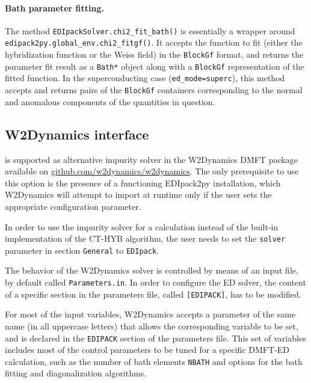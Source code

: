 \documentclass[edipack_sp.tex]{subfiles}
\begin{document}
\paragraph{{\bf Bath parameter fitting}.}
The method {\tt EDIpackSolver.chi2\_fit\_bath()} is essentially a wrapper around
{\tt edipack2py.global\_env.chi2\_fitgf()}. It accepts the function to fit (either
the hybridization function or the Weiss field) in the {\tt BlockGf} format,
and returns the parameter fit result as a {\tt Bath*} object along with a
{\tt BlockGf} representation of the fitted function. In the superconducting
case ({\tt ed\_mode=superc}), this method accepts and returns pairs of
the {\tt BlockGf} containers corresponding to the normal and anomalous 
components of the quantities in question.






\subsection{W2Dynamics interface}\label{sSecInteropW2DYN}
\NAME is supported as alternative impurity solver in the W2Dynamics DMFT package~\cite{Wallerberger2019CPC} available on \href{https://github.com/w2dynamics/w2dynamics}{github.com/w2dynamics/w2dynamics}. The only prerequisite to use this option is the presence of a functioning EDIpack2py installation, which W2Dynamics will attempt to import at runtime only if the user sets the appropriate configuration parameter.

In order to use the \NAME impurity solver for a calculation instead of the built-in implementation of the CT-HYB algorithm, the user needs to set the {\tt solver} parameter in section {\tt General} to {\tt EDIpack}. 

The  behavior of the W2Dynamics solver is controlled by means of an input file, by default called
{\tt Parameters.in}. In order to configure the ED solver, the content of a specific section in the parameters file, called {\tt [EDIPACK]}, has to be modified.

For most of the \NAME input variables, W2Dynamics accepts a parameter of the same name (in all uppercase letters) that allows the corresponding variable to be set, and is declared in the {\tt EDIPACK} section of the parameters file. This set of variables includes most of the control parameters to be tuned for a specific DMFT-ED calculation, such as the number of bath elements {\tt NBATH} and options for the bath fitting and diagonalization algorithms. 
\end{document}
